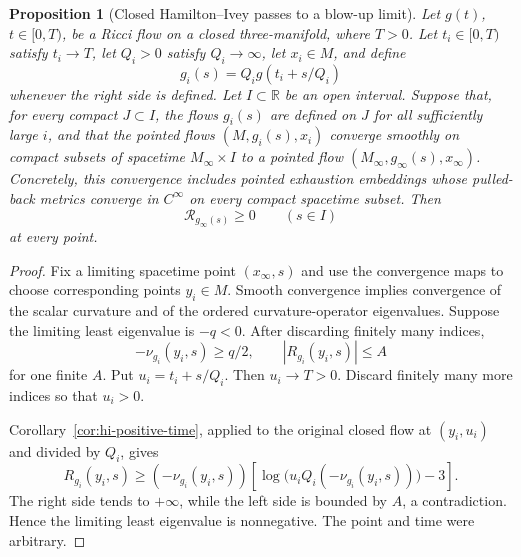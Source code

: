 \documentclass[10pt]{coll-l}
\newcommand{\R}{\mathbb{R}}
\newtheorem{proposition}[theorem]{Proposition}
\theoremstyle{definition}
\theoremstyle{remark}
\numberwithin{section}{chapter}
\numberwithin{equation}{chapter}
\begin{document}
\begin{proposition}[Closed Hamilton--Ivey passes to a blow-up limit]
\label{prop:closed-hamilton-ivey-blowup-limit}
Let $g(t)$, $t\in[0,T)$, be a Ricci flow on a closed three-manifold, where
$T>0$.  Let $t_i\in[0,T)$ satisfy $t_i\to T$, let $Q_i>0$ satisfy
$Q_i\to\infty$, let $x_i\in M$, and define
\begin{equation}
                       g_i(s)=Q_i g(t_i+s/Q_i)            \label{eq:closed-flow-parabolic-rescaling}
\end{equation}
whenever the right side is defined.  Let $I\subset\R$ be an open interval.
Suppose that, for every compact $J\subset I$, the flows $g_i(s)$ are
defined on $J$ for all sufficiently large $i$, and that the pointed flows
$(M,g_i(s),x_i)$ converge smoothly on compact subsets of spacetime
$M_\infty\times I$ to a pointed flow
$(M_\infty,g_\infty(s),x_\infty)$.  Concretely, this convergence includes
pointed exhaustion embeddings whose pulled-back metrics converge in
$C^\infty$ on every compact spacetime subset.  Then
\begin{equation}
                         \mathcal R_{g_\infty(s)}\geq0
                         \qquad(s\in I)                  \label{eq:closed-blowup-limit-nonnegative}
\end{equation}
at every point.
\end{proposition}

\begin{proof}
Fix a limiting spacetime point $(x_\infty,s)$ and use the convergence maps
to choose corresponding points $y_i\in M$.  Smooth convergence implies
convergence of the scalar curvature and of the ordered curvature-operator
eigenvalues.  Suppose the limiting least eigenvalue is $-q<0$.  After
discarding finitely many indices,
\[
              -\nu_{g_i}(y_i,s)\geq q/2,
       \qquad |R_{g_i}(y_i,s)|\leq A
\]
for one finite $A$.  Put $u_i=t_i+s/Q_i$.  Then $u_i\to T>0$.
Discard finitely many more indices so that $u_i>0$.

Corollary~\ref{cor:hi-positive-time}, applied to the original closed flow
at $(y_i,u_i)$ and divided by $Q_i$, gives
\begin{equation}
 R_{g_i}(y_i,s)
 \geq(-\nu_{g_i}(y_i,s))
   \left[
    \log\!\bigl(u_iQ_i(-\nu_{g_i}(y_i,s))\bigr)-3
   \right].                                              \label{eq:closed-hi-rescaled-contradiction}
\end{equation}
The right side tends to $+\infty$, while the left side is bounded by $A$,
a contradiction.  Hence the limiting least eigenvalue is nonnegative.
The point and time were arbitrary.
\end{proof}
\end{document}
